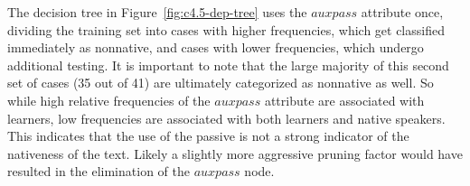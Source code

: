 \documentclass[main.tex]{subfiles}
\begin{document}

The decision tree in Figure~\ref{fig:c4.5-dep-tree} uses the $auxpass$ attribute once, dividing the training set into cases with higher frequencies, which get classified immediately as nonnative, and cases with lower frequencies, which undergo additional testing. It is important to note that the large majority of this second set of cases (35 out of 41) are ultimately categorized as nonnative as well. So while high relative frequencies of the $auxpass$ attribute are associated with learners, low frequencies are associated with both learners and native speakers. This indicates that the use of the passive is not a strong indicator of the nativeness of the text. Likely a slightly more aggressive pruning factor would have resulted in the elimination of the $auxpass$ node.

\end{document}
